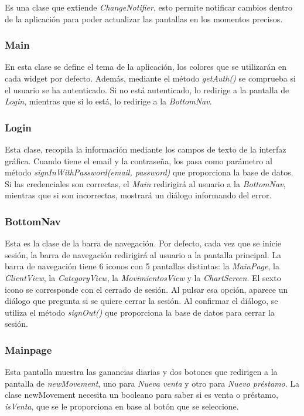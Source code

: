 Es una clase que extiende \textit{ChangeNotifier}, esto permite notificar cambios dentro de la aplicación para poder actualizar las pantallas en los momentos precisos. 

\subsubsection{Main}

En esta clase se define el tema de la aplicación, los colores que se utilizarán en cada widget por defecto. Además, mediante el método \textit{getAuth()} se comprueba si el usuario se ha autenticado. Si no está autenticado, lo redirige a la pantalla de \textit{Login}, mientras que si lo está, lo redirige a la \textit{BottomNav}. 

\subsubsection{Login}

Esta clase, recopila la información mediante los campos de texto de la interfaz gráfica. Cuando tiene el email y la contraseña, los pasa como parámetro al método \textit{signInWithPassword(email, password)} que proporciona la base de datos. Si las credenciales son correctas, el \textit{Main} redirigirá al usuario a la \textit{BottomNav}, mientras que si son incorrectas, mostrará un diálogo informando del error.


\subsubsection{BottomNav}

Esta es la clase de la barra de navegación. Por defecto, cada vez que se inicie sesión, la barra de navegación redirigirá al usuario a la pantalla principal. La barra de navegación tiene 6 iconos con 5 pantallas distintas: la \textit{MainPage}, la \textit{ClientView}, la \textit{CategoryView}, la \textit{MovimientosView} y la \textit{ChartScreen}. El sexto icono se corresponde con el cerrado de sesión. Al pulsar esa opción, aparece un diálogo que pregunta si se quiere cerrar la sesión. Al confirmar el diálogo, se utiliza el método \textit{signOut()} que proporciona la base de datos para cerrar la sesión. 

\subsubsection{Mainpage}

Esta pantalla muestra las ganancias diarias y dos botones que redirigen a la pantalla de \textit{newMovement}, uno para \textit{Nueva venta} y otro para \textit{Nuevo préstamo}. La clase newMovement necesita un booleano para saber si es venta o préstamo, \textit{isVenta}, que se le proporciona en base al botón que se seleccione. 

